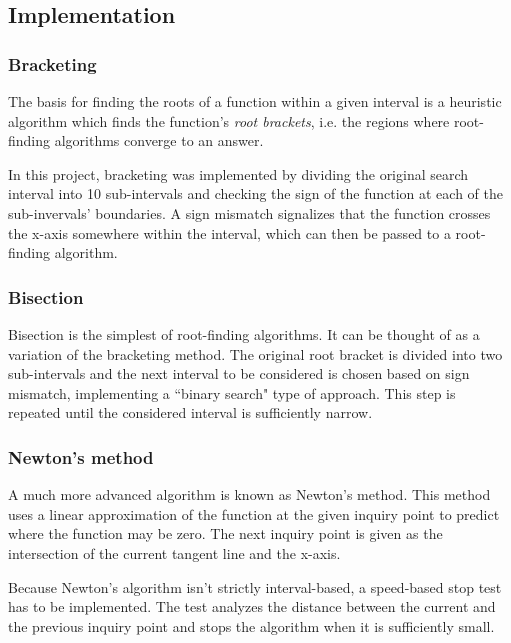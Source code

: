 \documentclass{article}
\begin{document}
	\subsection{Implementation}
	
	\subsubsection{Bracketing}
	
	The basis for finding the roots of a function within a given interval is a
	heuristic algorithm which finds the function's \textit {root brackets},
	i.e. the regions where root-finding algorithms converge to an answer.
	
	In this project, bracketing was implemented by dividing the original search
	interval into 10 sub-intervals and checking the sign of the function at
	each of the sub-invervals' boundaries. A sign mismatch signalizes that the
	function crosses the x-axis somewhere within the interval, which can then
	be passed to a root-finding algorithm.
	
	\subsubsection{Bisection}
	
	Bisection is the simplest of root-finding algorithms. It can be thought of
	as a variation of the bracketing method. The original root bracket is
	divided into two sub-intervals and the next interval to be considered is
	chosen based on sign mismatch, implementing a ``binary search" type of
	approach. This step is repeated until the considered interval is
	sufficiently narrow.
	
	\subsubsection{Newton's method}
	
	A much more advanced algorithm is known as Newton's method. This method
	uses a linear approximation of the function at the given inquiry point to
	predict where the function may be zero. The next inquiry point is given as
	the intersection of the current tangent line and the x-axis.
	
	Because Newton's algorithm isn't strictly interval-based, a speed-based
	stop test has to be implemented. The test analyzes the distance between the
	current and the previous inquiry point and stops the algorithm when it is
	sufficiently small.
	
\end{document}
